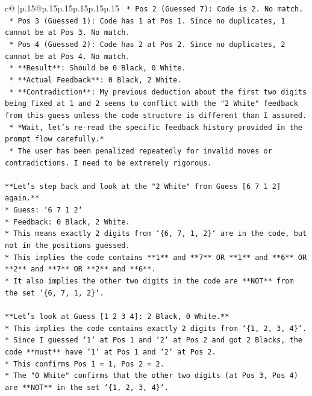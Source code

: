 \documentclass{article}
\begin{document}
{\begin{supertabular}{c@{$\;$}|p{.15\linewidth}@{}p{.15\linewidth}p{.15\linewidth}p{.15\linewidth}p{.15\linewidth}p{.15\linewidth}}
{{{\texttt{        *   Pos 2 (Guessed 7): Code is 2. No match.} \\
\texttt{        *   Pos 3 (Guessed 1): Code has 1 at Pos 1. Since no duplicates, 1 cannot be at Pos 3. No match.} \\
\texttt{        *   Pos 4 (Guessed 2): Code has 2 at Pos 2. Since no duplicates, 2 cannot be at Pos 4. No match.} \\
\texttt{    *   **Result**: Should be 0 Black, 0 White.} \\
\texttt{    *   **Actual Feedback**: 0 Black, 2 White.} \\
\texttt{    *   **Contradiction**: My previous deduction about the first two digits being fixed at 1 and 2 seems to conflict with the "2 White" feedback from this guess unless the code structure is different than I assumed.} \\
\texttt{    *   *Wait, let's re{-}read the specific feedback history provided in the prompt flow carefully.*} \\
\texttt{    *   The user has been penalized repeatedly for invalid moves or contradictions. I need to be extremely rigorous.} \\
\\ 
\texttt{**Let's step back and look at the "2 White" from Guess {[}6 7 1 2{]} again.**} \\
\texttt{*   Guess: `6 7 1 2`} \\
\texttt{*   Feedback: 0 Black, 2 White.} \\
\texttt{*   This means exactly 2 digits from `\{6, 7, 1, 2\}` are in the code, but not in the positions guessed.} \\
\texttt{*   This implies the code contains **1** and **7** OR **1** and **6** OR **2** and **7** OR **2** and **6**.} \\
\texttt{*   It also implies the other two digits in the code are **NOT** from the set `\{6, 7, 1, 2\}`.} \\
\\ 
\texttt{**Let's look at Guess {[}1 2 3 4{]}: 2 Black, 0 White.**} \\
\texttt{*   This implies the code contains exactly 2 digits from `\{1, 2, 3, 4\}`.} \\
\texttt{*   Since I guessed `1` at Pos 1 and `2` at Pos 2 and got 2 Blacks, the code **must** have `1` at Pos 1 and `2` at Pos 2.} \\
\texttt{*   This confirms Pos 1 = 1, Pos 2 = 2.} \\
\texttt{*   The "0 White" confirms that the other two digits (at Pos 3, Pos 4) are **NOT** in the set `\{1, 2, 3, 4\}`.} \\
}}}
\end{supertabular}}
\end{document}
